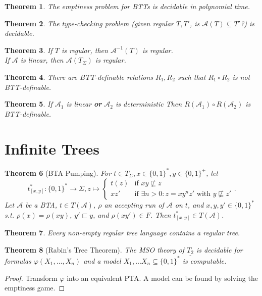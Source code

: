 \documentclass{article}
\newtheorem{theorem}{Theorem}[section]
\begin{document}
\begin{theorem}
	The emptiness problem for BTTs is decidable in polynomial time.
\end{theorem}

\begin{theorem}
	The type-checking problem (given regular $T, T'$, is $\mathcal{A}(T) \subseteq T'$?) is decidable.
\end{theorem}

\begin{theorem}
	If $T$ is regular, then $\mathcal{A}^{-1}(T)$ is regular. \\
	If $\mathcal{A}$ is linear, then $\mathcal{A}(T_\Sigma)$ is regular.
\end{theorem}

\begin{theorem}
	There are BTT-definable relations $R_1, R_2$ such that $R_1 \circ R_2$ is not BTT-definable.
\end{theorem}

\begin{theorem}
	If $\mathcal{A}_1$ is linear \textbf{or} $\mathcal{A}_2$ is deterministic Then $R(\mathcal{A}_1) \circ R(\mathcal{A}_2)$ is BTT-definable.
\end{theorem}


\section{Infinite Trees}
\begin{theorem}[BTA Pumping]
	For $t \in T_\Sigma, x \in \{0,1\}^*, y \in \{0,1\}^+$, let 
	$$t^*_{[x,y]} : \{0,1\}^* \rightarrow \Sigma, z \mapsto \begin{cases} t(z) & \text{if } xy \not\sqsubseteq z \\ xz' & \text{if } \exists n>0: z = xy^nz' \text{ with } y \not\sqsubseteq z' \end{cases}.$$
	Let $\mathcal{A}$ be a BTA, $t \in T(\mathcal{A})$, $\rho$ an accepting run of $\mathcal{A}$ on $t$, and $x, y, y' \in \{0,1\}^*$ s.t. $\rho(x) = \rho(xy)$, $y' \sqsubset y$, and $\rho(xy') \in F$. Then $t^*_{[x,y]} \in T(\mathcal{A})$.
\end{theorem}

\begin{theorem}
	Every non-empty regular tree language contains a regular tree.
\end{theorem}

\begin{theorem}[Rabin's Tree Theorem]
	The MSO theory of $\underline{T_2}$ is decidable for formulas $\varphi(X_1, \dots, X_n)$ and a model $X_1, \dots X_n \subseteq \{0,1\}^*$ is computable.
\end{theorem}
\begin{proof}
	Transform $\varphi$ into an equivalent PTA. A model can be found by solving the emptiness game.
\end{proof}
\end{document}
